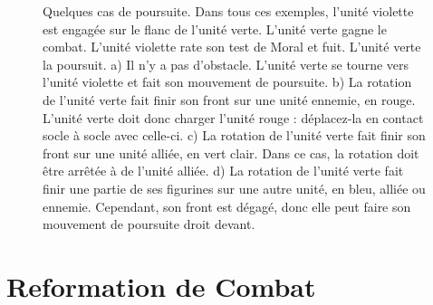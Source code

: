 \newcommand{\figPursA}{a)}
\newcommand{\figPursB}{b)}
\newcommand{\figPursC}{c)}
\newcommand{\figPursD}{d)}
\newcommand{\figPursFrontofgreenunitontopofredunit}{Front sur l'unité rouge}
\newcommand{\figPursFrontofgreenunitontopoflightgreenunit}{Front sur l'unité vert clair}
\newcommand{\figPursFrontofgreenunitclearofblueunit}{Front dégagé de l'unité bleue}

\begin{figure}[!htbp]
\hypertarget{pursuitsfigure}{
\begin{minipage}{0.53\textwidth}
\def\svgwidth{\textwidth}

\end{minipage}\hfill\begin{minipage}{0.44\textwidth}
\caption{Quelques cas de poursuite.\vspace*{10pt}\newline
Dans tous ces exemples, l'unité violette est engagée sur le flanc de l'unité verte. L'unité verte gagne le combat. L'unité violette rate son test de Moral et fuit. L'unité verte la poursuit.\vspace*{10pt}\newline
a) Il n'y a pas d'obstacle. L'unité verte se tourne vers l'unité violette et fait son mouvement de poursuite.\vspace*{10pt}\newline
b) La rotation de l'unité verte fait finir son front sur une unité ennemie, en rouge. L'unité verte doit donc charger l'unité rouge : déplacez-la en contact socle à socle avec celle-ci.\vspace*{10pt}\newline
c) La rotation de l'unité verte fait finir son front sur une unité alliée, en vert clair. Dans ce cas, la rotation doit être arrêtée à  de l'unité alliée.\vspace*{10pt}\newline
d) La rotation de l'unité verte fait finir une partie de ses figurines sur une autre unité, en bleu, alliée ou ennemie. Cependant, son front est dégagé, donc elle peut faire son mouvement de poursuite droit devant.}
\label{figure/pursuit}
\end{minipage}}
\end{figure}

\clearpage
\hypertarget{combatreform}{\section{Reformation de Combat}}

